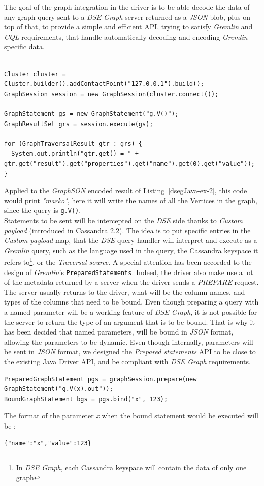 \documentclass[a4paper]{report}
\newcommand{\dseg}{\emph{DSE Graph\xspace}}
\begin{document}
The goal of the graph integration in the driver is to be able decode the data of any graph query sent to a \dseg{} server returned as a \emph{JSON} blob, plus on top of that, to provide a simple and efficient API, trying to satisfy \emph{Gremlin} and \emph{CQL} requirements, that handle automatically decoding and encoding \emph{Gremlin}-specific data.\\
\begin{lstlisting}[label=dsegJava-ex-1, caption=Designed API for the Java Driver, style=Java]

Cluster cluster = Cluster.builder().addContactPoint("127.0.0.1").build();
GraphSession session = new GraphSession(cluster.connect());

GraphStatement gs = new GraphStatement("g.V()");
GraphResultSet grs = session.execute(gs);

for (GraphTraversalResult gtr : grs) {
  System.out.println("gtr.get() = " + gtr.get("result").get("properties").get("name").get(0).get("value"));
}
\end{lstlisting}
Applied to the \emph{GraphSON} encoded result of Listing~\ref{dsegJava-ex-2}, this code would print \emph{"marko"}, here it will write the names of all the Vertices in the graph, since the query is \verb;g.V();.\\
Statements to be sent will be intercepted on the \emph{DSE} side thanks to \emph{Custom payload} (introduced in Cassandra 2.2). The idea is to put specific entries in the \emph{Custom payload} map, that the \emph{DSE} query handler will interpret and execute as a \emph{Gremlin} query, such as the language used in the query, the Cassandra keyspace it refers to\footnote{In \dseg{}, each Cassandra keyspace will contain the data of only one graph}, or the \emph{Traversal source}.
A special attention has been accorded to the design of \emph{Gremlin}'s \verb;PreparedStatements;. Indeed, the driver also make use a lot of the metadata returned by a server when the driver sends a \emph{PREPARE} request. The server usually returns to the driver, what will be the column names, and types of the columns that need to be bound. Even though preparing a query with a named parameter will be a working feature of \dseg{}, it is not possible for the server to return the type of an argument that is to be bound. That is why it has been decided that named parameters, will be bound in \emph{JSON} format, allowing the parameters to be dynamic. Even though internally, parameters will be sent in \emph{JSON} format, we designed the \emph{Prepared statements} API to be close to the existing Java Driver API, and be compliant with \emph{DSE Graph} requirements.
\begin{lstlisting}[label=dsegJava-ex-3, caption=Designed Prepared statements API for the Java Driver, style=Java]
PreparedGraphStatement pgs = graphSession.prepare(new GraphStatement("g.V(x).out"));
BoundGraphStatement bgs = pgs.bind("x", 123);
\end{lstlisting}
The format of the parameter \emph{x} when the bound statement would be executed will be :
\begin{lstlisting}[label=dsegJava-ex-4, caption=Bound parameters GraphSON format, style=Java]
{"name":"x","value":123}
\end{lstlisting}
\end{document}
